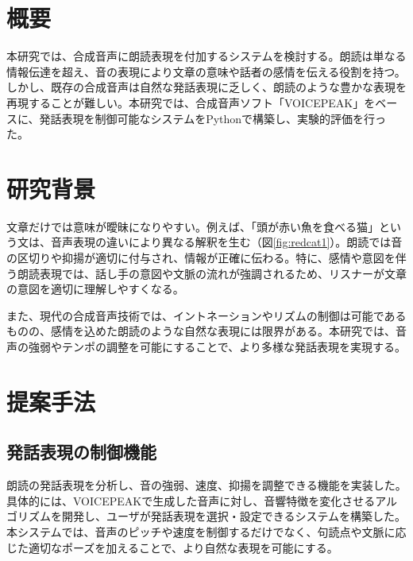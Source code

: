 \def\sectionmargin{\vspace{7pt}}



\section{概要}
本研究では、合成音声に朗読表現を付加するシステムを検討する。朗読は単なる情報伝達を超え、音の表現により文章の意味や話者の感情を伝える役割を持つ。しかし、既存の合成音声は自然な発話表現に乏しく、朗読のような豊かな表現を再現することが難しい。本研究では、合成音声ソフト「VOICEPEAK」をベースに、発話表現を制御可能なシステムをPythonで構築し、実験的評価を行った。

\sectionmargin
\section{研究背景}
文章だけでは意味が曖昧になりやすい。例えば、「頭が赤い魚を食べる猫」という文は、音声表現の違いにより異なる解釈を生む（図\ref{fig:redcat1}）。朗読では音の区切りや抑揚が適切に付与され、情報が正確に伝わる。特に、感情や意図を伴う朗読表現では、話し手の意図や文脈の流れが強調されるため、リスナーが文章の意図を適切に理解しやすくなる。

また、現代の合成音声技術では、イントネーションやリズムの制御は可能であるものの、感情を込めた朗読のような自然な表現には限界がある。本研究では、音声の強弱やテンポの調整を可能にすることで、より多様な発話表現を実現する。

\sectionmargin\section{提案手法}

\subsection{発話表現の制御機能}
朗読の発話表現を分析し、音の強弱、速度、抑揚を調整できる機能を実装した。具体的には、VOICEPEAKで生成した音声に対し、音響特徴を変化させるアルゴリズムを開発し、ユーザが発話表現を選択・設定できるシステムを構築した。本システムでは、音声のピッチや速度を制御するだけでなく、句読点や文脈に応じた適切なポーズを加えることで、より自然な表現を可能にする。


